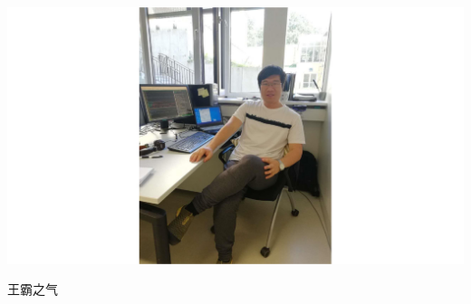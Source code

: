 
\begin{pre}
	\thispagestyle{empty}
	\begin{center}
		{}
	\end{center}

\vspace*{5\baselineskip}
\centerline{\includegraphics[scale=0.6]{figure/my-photo.pdf}}
\vspace*{1\baselineskip}
\centerline{\fontsize{26pt}{26pt}王霸之气}
\end{pre}
